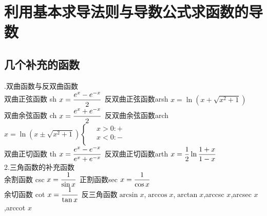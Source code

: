 \section{利用基本求导法则与导数公式求函数的导数}
\subsection{几个补充的函数}\vspace*{0.5em}
.\enspace 双曲函数与反双曲函数\vspace*{1em}\\
双曲正弦函数 \kg sh $x=\displaystyle\frac{e^x-e^{-x}}{2}$  \kg \kg 反双曲正弦函数\kg arsh $x=\ln(x+\sqrt{x^2+1})$\vspace*{1em}\\
双曲余弦函数 \kg ch $x=\displaystyle\frac{e^x+e^{-x}}{2}$  \kg \kg 反双曲余弦函数\kg arch $x=\ln(x\pm\sqrt{x^2+1})\left\{\begin{aligned}
		&  \, x>0:+\\
		&  \, x<0:-\\
		\end{aligned}\right.
		$\vspace*{1em}\\
双曲正切函数 \kg th $x=\displaystyle\frac{e^x-e^{-x}}{e^x+e^{-x}}$  \kg \kg 反双曲正切函数\kg arth $x=\displaystyle\frac{1}{2}\ln\displaystyle\frac{1+x}{1-x}$\vspace*{1em}\\
2.\enspace 三角函数的补充函数\vspace*{1em}\\
余割函数 \kg csc $x=\displaystyle\frac{1}{\sin x}$  \kg \kg 正割函数\kg sec $x=\displaystyle\frac{1}{\cos x}$\vspace*{1em}\\
余切函数 \kg cot $x=\displaystyle\frac{1}{\tan x}$  \kg \kg 反三角函数\kg  $\arcsin x$,$\arccos x$,$\arctan x$,arccsc $x$,arcsec $x$,arccot $x$
